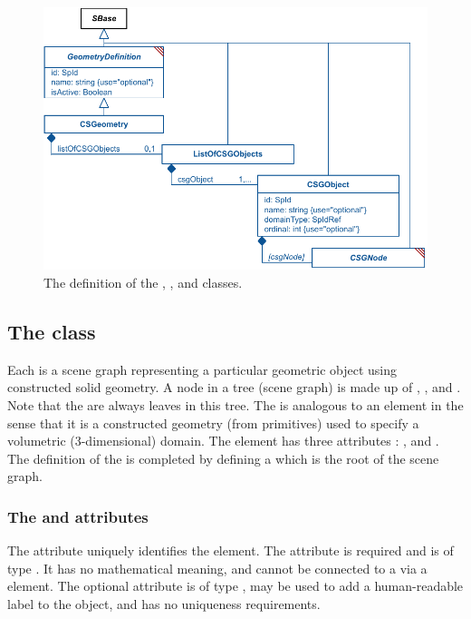 \begin{figure}[ht]
  \includegraphics{figs/CSGeometry-uml}
  \caption{The definition of the \CSGeometry, \ListOfCSGObjects, and \CSGObject classes.}
  \label{CSGeometry-uml}
  \label{ListOfCSGObjects-uml}
  \label{CSGObject-uml}
\end{figure}



\subsection{The  class}
\label{csgobject-class}
Each \CSGObject is a scene graph representing a particular geometric object using constructed solid geometry. A node in a tree (scene graph) is made up of \CSGPrimitives, \CSGSetOperators, and \CSGTransformations.  Note that the \CSGPrimitives are always leaves in this tree. The \CSGObject is analogous to an \AnalyticVolume element in the sense that it is a constructed geometry (from primitives) used to specify a volumetric (3-dimensional) domain. The \CSGObject element has three attributes : ,  and . The definition of the \CSGObject is completed by defining a \CSGNode which is the root of the \CSGObject scene graph.

\subsubsection{The \fixttspace{} and \fixttspace{} attributes}
The  attribute uniquely identifies the \CSGObject element. The attribute is required and is of type .  It has no mathematical meaning, and cannot be connected to a \Parameter via a \SpatialSymbolReference element.  The optional  attribute is of type , may be used to add a human-readable label to the object, and has no uniqueness requirements.

